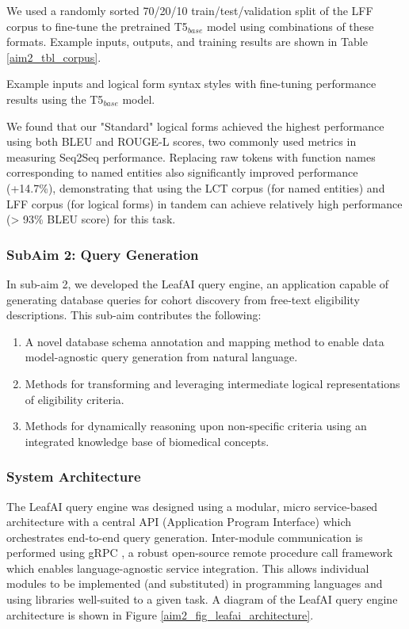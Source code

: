\documentclass[../main.tex]{subfiles}
\begin{document}
We used a randomly sorted 70/20/10 train/test/validation split of the LFF corpus to fine-tune the pretrained T5$_{base}$ model using combinations of these formats. Example inputs, outputs, and training results are shown in Table \ref{aim2_tbl_corpus}. 

\begin{table}[h!]
    \footnotesize
    \centering
    
    \caption{Example inputs and logical form syntax styles with fine-tuning performance results using the T5$_{base}$ model.}
    \label{aim2_tbl_corpus}
\end{table} 

We found that our "Standard" logical forms achieved the highest performance using both BLEU \cite{lin2004rouge} and ROUGE-L \cite{ callison2006re} scores, two commonly used metrics in measuring Seq2Seq performance. Replacing raw tokens with function names corresponding to named entities also significantly improved performance (+14.7\%), demonstrating that using the LCT corpus (for named entities) and LFF corpus (for logical forms) in tandem can achieve relatively high performance (> 93\% BLEU score) for this task.

\subsubsection{SubAim 2: Query Generation}
In sub-aim 2, we developed the LeafAI query engine, an application capable of generating database queries for cohort discovery from free-text eligibility descriptions. This sub-aim contributes the following:

\begin{enumerate}
    \item{A novel database schema annotation and mapping method to enable data model-agnostic query generation from natural language.}
    \item{Methods for transforming and leveraging intermediate logical representations of eligibility criteria.}
    \item{Methods for dynamically reasoning upon non-specific criteria using an integrated knowledge base of biomedical concepts.}
\end{enumerate}

\subsubsection{System Architecture}

The LeafAI query engine was designed using a modular, micro service-based architecture with a central API (Application Program Interface) which orchestrates end-to-end query generation. Inter-module communication is performed using gRPC \cite{grpc}, a robust open-source remote procedure call framework which enables language-agnostic service integration. This allows individual modules to be implemented (and substituted) in programming languages and using libraries well-suited to a given task. A diagram of the LeafAI query engine architecture is shown in Figure \ref{aim2_fig_leafai_architecture}. 
\end{document}
